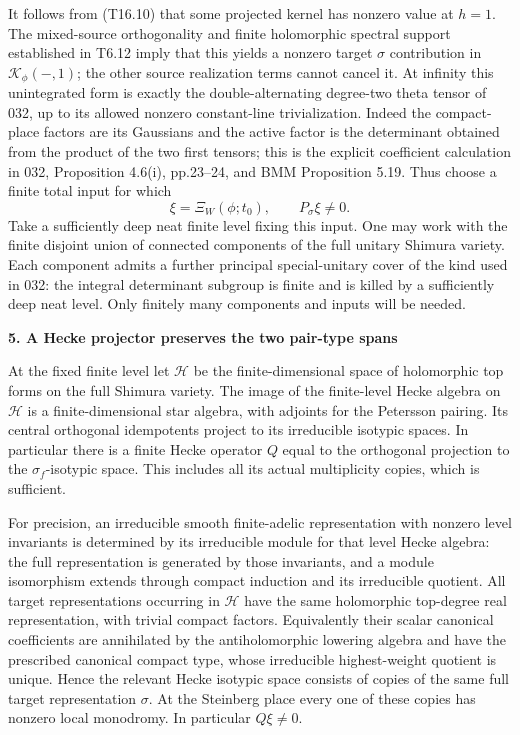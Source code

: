 \documentclass[11pt,a4paper]{article}
\theoremstyle{definition}
\begin{document}
It follows from (T16.10) that some projected kernel has nonzero value at \(h=1\). The mixed-source orthogonality and finite holomorphic spectral support established in T6.12 imply that this yields a nonzero target \(\sigma\) contribution in \(\mathcal K_\phi(-,1)\); the other source realization terms cannot cancel it. At infinity this unintegrated form is exactly the double-alternating degree-two theta tensor of 032, up to its allowed nonzero constant-line trivialization. Indeed the compact-place factors are its Gaussians and the active factor is the determinant obtained from the product of the two first tensors; this is the explicit coefficient calculation in 032, Proposition 4.6(i), pp.23--24, and BMM Proposition 5.19. Thus choose a finite total input for which \[
\xi=\Xi_W(\phi;t_0),\qquad P_\sigma\xi\ne0.
\tag{T16.11}
\] Take a sufficiently deep neat finite level fixing this input. One may work with the finite disjoint union of connected components of the full unitary Shimura variety. Each component admits a further principal special-unitary cover of the kind used in 032: the integral determinant subgroup is finite and is killed by a sufficiently deep neat level. Only finitely many components and inputs will be needed.

\textbf{5. A Hecke projector preserves the two pair-type spans}

At the fixed finite level let \(\mathcal H\) be the finite-dimensional space of holomorphic top forms on the full Shimura variety. The image of the finite-level Hecke algebra on \(\mathcal H\) is a finite-dimensional star algebra, with adjoints for the Petersson pairing. Its central orthogonal idempotents project to its irreducible isotypic spaces. In particular there is a finite Hecke operator \(Q\) equal to the orthogonal projection to the \(\sigma_f\)-isotypic space. This includes all its actual multiplicity copies, which is sufficient.

For precision, an irreducible smooth finite-adelic representation with nonzero level invariants is determined by its irreducible module for that level Hecke algebra: the full representation is generated by those invariants, and a module isomorphism extends through compact induction and its irreducible quotient. All target representations occurring in \(\mathcal H\) have the same holomorphic top-degree real representation, with trivial compact factors. Equivalently their scalar canonical coefficients are annihilated by the antiholomorphic lowering algebra and have the prescribed canonical compact type, whose irreducible highest-weight quotient is unique. Hence the relevant Hecke isotypic space consists of copies of the same full target representation \(\sigma\). At the Steinberg place every one of these copies has nonzero local monodromy. In particular \(Q\xi\ne0\).
\end{document}
